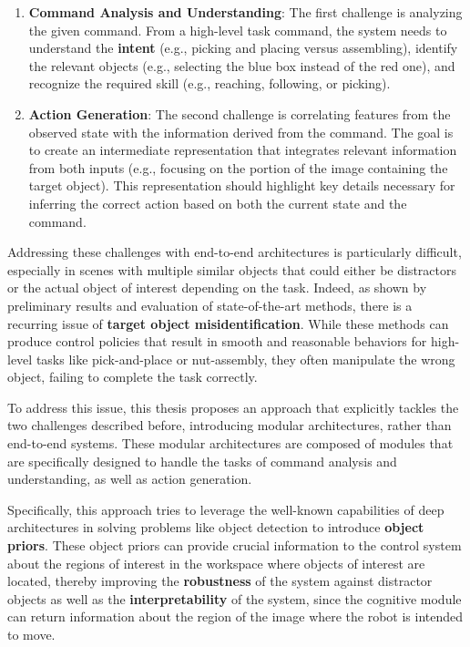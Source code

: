 \begin{enumerate}
    \item \textbf{Command Analysis and Understanding}: The first challenge is analyzing the given command. From a high-level task command, the system needs to understand the \textbf{intent} (e.g., picking and placing versus assembling), identify the relevant objects (e.g., selecting the blue box instead of the red one), and recognize the required skill (e.g., reaching, following, or picking).

    \item \textbf{Action Generation}: The second challenge is correlating features from the observed state with the information derived from the command. The goal is to create an intermediate representation that integrates relevant information from both inputs (e.g., focusing on the portion of the image containing the target object). This representation should highlight key details necessary for inferring the correct action based on both the current state and the command.
\end{enumerate}

Addressing these challenges with end-to-end architectures is particularly difficult, especially in scenes with multiple similar objects that could either be distractors or the actual object of interest depending on the task. Indeed, as shown by preliminary results and evaluation of state-of-the-art methods, there is a recurring issue of \textbf{target object misidentification}. While these methods can produce control policies that result in smooth and reasonable behaviors for high-level tasks like pick-and-place or nut-assembly, they often manipulate the wrong object, failing to complete the task correctly.

To address this issue, this thesis proposes an approach that explicitly tackles the two challenges described before, introducing modular architectures, rather than end-to-end systems. These modular architectures are composed of modules that are specifically designed to handle the tasks of command analysis and understanding, as well as action generation.

Specifically, this approach tries to leverage the well-known capabilities of deep architectures in solving problems like object detection to introduce \textbf{object priors}. These object priors can provide crucial information to the control system about the regions of interest in the workspace where objects of interest are located, thereby improving the \textbf{robustness} of the system against distractor objects as well as the \textbf{interpretability} of the system, since the cognitive module can return information about the region of the image where the robot is intended to move.

